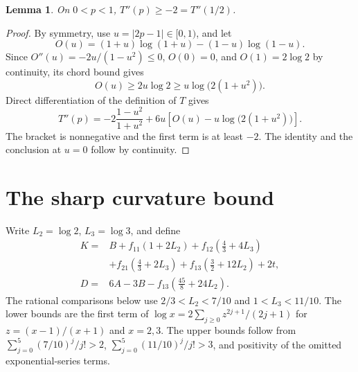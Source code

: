 \documentclass[11pt,a4paper]{article}
\newtheorem{lemma}[theorem]{Lemma}
\begin{document}
\begin{lemma}\label{lem:T}
On \(0<p<1\), \(T''(p)\ge-2=T''(1/2)\).
\end{lemma}
\begin{proof}
By symmetry, use \(u=|2p-1|\in[0,1)\), and let
\[
 O(u)=(1+u)\log(1+u)-(1-u)\log(1-u).
\]
Since \(O''(u)=-2u/(1-u^2)\le0\), \(O(0)=0\), and
\(O(1)=2\log2\) by continuity, its chord bound gives
\[
 O(u)\ge2u\log2\ge u\log\bigl(2(1+u^2)\bigr).
\]
Direct differentiation of the definition of \(T\) gives
\[
 T''(p)=-2\frac{1-u^2}{1+u^2}
 +6u\left[O(u)-u\log\bigl(2(1+u^2)\bigr)\right].
\]
The bracket is nonnegative and the first term is at least \(-2\).
The identity and the conclusion at \(u=0\) follow by continuity.
\end{proof}

\section{The sharp curvature bound}
Write \(L_2=\log2\), \(L_3=\log3\), and define
\begin{align*}
 K={}&B+f_{11}(1+2L_2)+f_{12}(\tfrac43+4L_3)\\
    &+f_{21}(\tfrac43+2L_3)+f_{13}(\tfrac32+12L_2)+2t,\\
 D={}&6A-3B-f_{13}(\tfrac{45}8+24L_2).
\end{align*}
The rational comparisons below use \(2/3<L_2<7/10\) and
\(1<L_3<11/10\). The lower bounds are the first term of
\(\log x=2\sum_{j\ge0}z^{2j+1}/(2j+1)\) for \(z=(x-1)/(x+1)\)
and \(x=2,3\). The upper bounds follow from
\(\sum_{j=0}^5(7/10)^j/j!>2\), \(\sum_{j=0}^5(11/10)^j/j!>3\),
and positivity of the omitted exponential-series terms.
\end{document}
